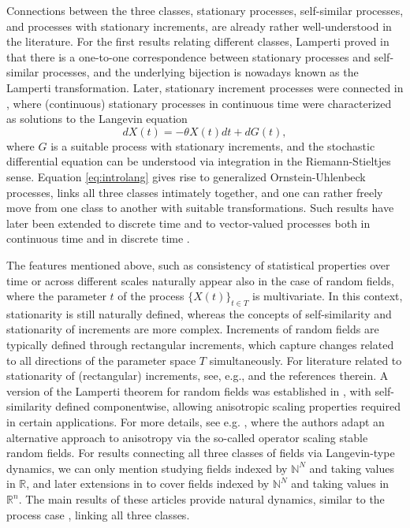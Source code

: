 \documentclass[english, a4paper, 12pt,reqno]{amsart}
\begin{document}
Connections between the three classes, stationary processes, self-similar processes, and processes with stationary increments, are already rather well-understood in the literature. For the first results relating different classes, Lamperti proved in \cite{Lamperti-1962} that there is a one-to-one correspondence between stationary processes and self-similar processes, and the underlying bijection is nowadays known as the Lamperti transformation. Later, stationary increment processes were connected in \cite{Viitasaari-2016a}, where (continuous) stationary processes in continuous time were characterized as solutions to the Langevin equation 
\begin{equation}
\label{eq:introlang}
dX(t) = - \theta X(t) dt + dG(t),
\end{equation}
where $G$ is a suitable process with stationary increments, and the stochastic differential equation can be understood via integration in the Riemann-Stieltjes sense. Equation \eqref{eq:introlang} gives rise to generalized Ornstein-Uhlenbeck processes, links all three classes intimately together, and one can rather freely move from one class to another with suitable transformations. Such results have later been extended to discrete time \cite{voutilainen2017model} and to vector-valued processes both in continuous time \cite{voutilainen2021vector} and in discrete time \cite{voutilainen2020modeling}.

The features mentioned above, such as consistency of statistical properties over time or across different scales naturally appear also in the case of random fields, where the parameter $t$ of the process $\{X(t)\}_{t\in T}$ is multivariate. In this context, stationarity is still naturally defined, whereas the concepts of self-similarity and stationarity of increments are more complex. Increments of random fields are typically defined through rectangular increments, which capture changes related to all directions of the parameter space $T$ simultaneously. For literature related to stationarity of (rectangular) increments, see, e.g., \cite{makogin2015example,makogin2019gaussian} and the references therein. A version of the Lamperti theorem for random fields was established in \cite{genton2007self}, with self-similarity defined componentwise, allowing anisotropic scaling properties required in certain applications. For more details, see e.g. \cite{bierme2007operator}, where the authors adapt an alternative approach to anisotropy via the so-called operator scaling stable random fields.
For results connecting all three classes of fields via Langevin-type dynamics, we can only mention \cite{discrete} studying fields indexed by $\mathbb{N}^N$ and taking values in $\mathbb{R}$, and later extensions in \cite{voutilainen2025one} to cover fields indexed by $\mathbb{N}^N$ and taking values in $\mathbb{R}^n$. The main results of these articles provide natural dynamics, similar to the process case \cite{voutilainen2017model}, linking all three classes.
\end{document}
